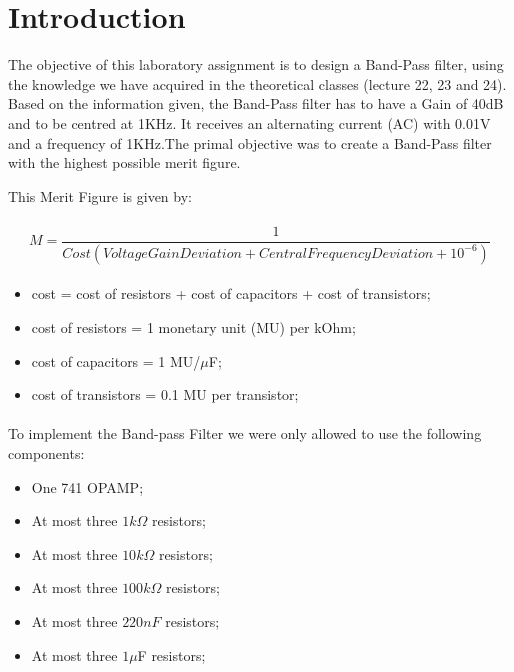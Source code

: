\section{Introduction}
\label{sec:introduction}

The objective of this laboratory assignment is to design a Band-Pass filter, using the knowledge  we have acquired in the theoretical classes (lecture 22, 23 and 24). Based on the information given, the Band-Pass filter has to have a Gain of 40dB and to be centred at 1KHz. It receives an alternating current (AC) with 0.01V and a frequency of 1KHz.The primal objective was to create a Band-Pass filter with the highest possible merit figure.



This Merit Figure is given by:
\paragraph{}

\begin{equation}
    M = \frac{1}{Cost (VoltageGainDeviation + CentralFrequencyDeviation + 10^{-6})}  
\end{equation}

\paragraph{}
\begin{itemize}
    \item cost = cost of resistors + cost of capacitors + cost of transistors;
    \item cost of resistors = 1 monetary unit (MU) per kOhm;
    \item cost of capacitors = 1 MU/$\mu$F;
    \item cost of transistors = 0.1 MU per transistor;
\end{itemize}

\paragraph{}
To implement the Band-pass Filter we were only allowed to use the following components:

\begin{itemize}
    \item One 741 OPAMP;
    \item At most three $1 k\Omega$ resistors;
    \item At most three $10 k\Omega$ resistors;
    \item At most three $100 k\Omega$ resistors;
    \item At most three $220 nF$ resistors;
    \item At most three $1 \mu$F resistors;
\end{itemize}

